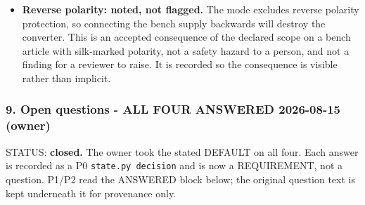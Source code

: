 \documentclass[11pt,a4paper]{article}
\begin{document}
\begin{itemize}
\begin{itemize}
net pair is 30 V apart, which the pipeline's \texttt{check\_creepage} treats
as a clean no-op (its derived check engages only above 30 V). If the
answer to Open question 1 lifts the ceiling above 30 V, that check
engages for real and IPC-2221 spacing starts binding the layout. The
boundary is therefore not cosmetic.
\item What WAS genuinely ambiguous - whether 30 V is the \emph{operating} or the
\emph{survival} ceiling, and what the input does on a live connection - is
now ANSWERED (A1, A2): 30 V is a hard maximum OPERATING input, and
there is no live hot-plug. The converter carries \textgreater{}= 36 V absolute-max
as its own headroom; no clamp is added. The flag therefore stays
DOES-NOT-APPLY on settled requirements, not merely on the boundary
reading.
\end{itemize}
\item \textbf{Reverse polarity: noted, not flagged.} The mode excludes reverse
polarity protection, so connecting the bench supply backwards will
destroy the converter. This is an accepted consequence of the declared
scope on a bench article with silk-marked polarity, not a safety hazard
to a person, and not a finding for a reviewer to raise. It is recorded
so the consequence is visible rather than implicit.
\end{itemize}
\subsubsection*{9. Open questions - ALL FOUR ANSWERED 2026-08-15 (owner)}
STATUS: \textbf{closed.} The owner took the stated DEFAULT on all four. Each answer is recorded as a P0 \texttt{state.py decision} and is now a REQUIREMENT, not a question. P1/P2 read the ANSWERED block below; the original question text is kept underneath it for provenance only.
\end{document}
